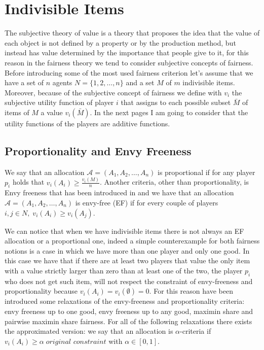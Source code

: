 \section{Indivisible Items}
The subjective theory of value is a theory that proposes the idea that the value of each object is not defined by a property or by the production method, but instead has value determined by the importance that people give to it, for this reason in the fairness theory we tend to consider subjective concepts of fairness\cite{wiki-fair-division}. 
Before introducing some of the most used fairness criterion let's assume that we have a set of $n$ agents $N=\{1,2,\dots,n\}$ and a set $M$ of $m$ indivisible items. Moreover, because of the subjective concept of fairness we define with $v_i$ the subjective utility function of player $i$ that assigns to each possible subset $\bar M$ of items of $M$ a value $v_i(\bar M)$. In the next pages I am going to consider that the utility functions of the players are additive functions.

\subsection{Proportionality and Envy Freeness}
We say that an allocation $\mathcal{A} = (A_1, A_2, \dots, A_n)$ is proportional if for any player $p_i$ holds that $v_i(A_i) \ge \frac{v_i(M)}{n}$. Another criteria, other than proportionality, is Envy freeness that has been introduced in \cite{Foley1967-EF} \cite{VARIAN197463-EF} and we have that an allocation $\mathcal{A} = (A_1, A_2, \dots, A_n)$ is envy-free (EF) if for every couple of players $i,j\in N, \; v_i(A_i)\ge v_i(A_j)$. 

We can notice that when we have indivisible items there is not always an EF allocation or a proportional one, indeed a simple counterexample for both fairness notions is a case in which we have more than one player and only one good. In this case we have that if there are at least two players that value the only item with a value strictly larger than zero than at least one of the two, the player $p_i$ who does not get such item, will not respect the constraint of envy-freeness and proportionality because $v_i(A_i) = v_i(\emptyset) = 0$. For this reason have been introduced some relaxations of the envy-freeness and proportionality criteria: envy freeness up to one good, envy freeness up to any good, maximin share and pairwise maximin share fairness. For all of the following relaxations there exists the approximated version: we say that an allocation is $\alpha$-criteria if $v_i(A_i) \ge \alpha\;\textit{original constraint}$ with $\alpha \in [0,1]$.

